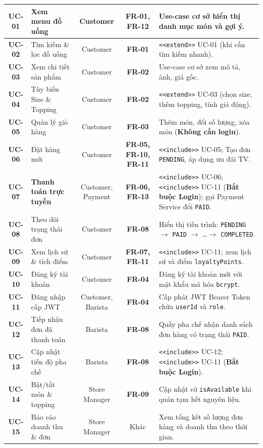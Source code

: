 \documentclass[12pt,a4paper]{article}
\begin{document}
\begin{xltabular}{\textwidth}{|c|>{\raggedright\arraybackslash}p{3.2cm}|c|c|>{\raggedright\arraybackslash}X|}
\textbf{UC-01} & Xem menu đồ uống & Customer & \textbf{FR-01, FR-12} & Use-case cơ sở hiển thị danh mục món và gợi ý. \\
\hline
\textbf{UC-02} & Tìm kiếm \& lọc đồ uống & Customer & \textbf{FR-01} & \texttt{<<extend>>} UC-01 (khi cần tìm kiếm nhanh). \\
\hline
\textbf{UC-03} & Xem chi tiết sản phẩm & Customer & \textbf{FR-02} & Use-case cơ sở xem mô tả, ảnh, giá gốc. \\
\hline
\textbf{UC-04} & Tùy biến Size \& Topping & Customer & \textbf{FR-02} & \texttt{<<extend>>} UC-03 (chọn size, thêm topping, tính giá động). \\
\hline
\textbf{UC-05} & Quản lý giỏ hàng & Customer & \textbf{FR-03} & Thêm món, đổi số lượng, xóa món (\textbf{Không cần login}). \\
\hline
\textbf{UC-06} & Đặt hàng mới & Customer & \textbf{FR-05, FR-10, FR-11} & \texttt{<<include>>} UC-05; Tạo đơn \texttt{PENDING}, áp dụng ưu đãi TV. \\
\hline
\textbf{UC-07} & \textbf{Thanh toán trực tuyến} & Customer, Payment & \textbf{FR-06, FR-13} & \texttt{<<include>>} UC-06; \texttt{<<include>>} UC-11 (\textbf{Bắt buộc Login}); gọi Payment Service đổi \texttt{PAID}. \\
\hline
\textbf{UC-08} & Theo dõi trạng thái đơn & Customer & \textbf{FR-08} & Hiển thị tiến trình: \texttt{PENDING} $\rightarrow$ \texttt{PAID} $\rightarrow$ \dots $\rightarrow$ \texttt{COMPLETED}. \\
\hline
\textbf{UC-09} & Xem lịch sử \& tích điểm & Customer & \textbf{FR-07, FR-11} & \texttt{<<include>>} UC-11; xem lịch sử và điểm \texttt{loyaltyPoints}. \\
\hline
\textbf{UC-10} & Đăng ký tài khoản & Customer & \textbf{FR-04} & Đăng ký tài khoản mới với mật khẩu mã hóa \texttt{bcrypt}. \\
\hline
\textbf{UC-11} & Đăng nhập cấp JWT & Customer, Barista & \textbf{FR-04} & Cấp phát JWT Bearer Token chứa \texttt{userId} và \texttt{role}. \\
\hline
\textbf{UC-12} & Tiếp nhận đơn đã thanh toán & Barista & \textbf{FR-08} & Quầy pha chế nhận danh sách đơn hàng có trạng thái \texttt{PAID}. \\
\hline
\textbf{UC-13} & Cập nhật tiến độ pha chế & Barista & \textbf{FR-08} & \texttt{<<include>>} UC-12; \texttt{<<include>>} UC-11 (\textbf{Bắt buộc Login}). \\
\hline
\textbf{UC-14} & Bật/tắt món \& topping & Store Manager & \textbf{FR-09} & Cập nhật cờ \texttt{isAvailable} khi quán tạm hết nguyên liệu. \\
\hline
\textbf{UC-15} & Báo cáo doanh thu \& đơn & Store Manager & Khác & Xem tổng kết số lượng đơn hàng và doanh thu theo thời gian. \\
\end{xltabular}
\end{document}
